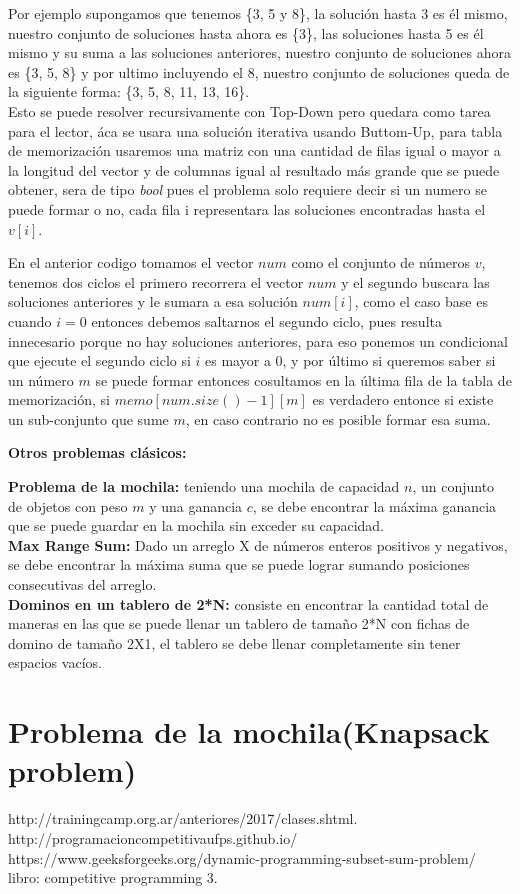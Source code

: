 \documentclass[12pt, a4paper]{article}
\newcommand\cppfile[2][]{

}
\newcommand{\subtitulo}[1]{\begin{center}\textbf{#1}\end{center}}
\begin{document}
	Por ejemplo supongamos que tenemos \{3, 5 y 8\}, la solución hasta 3 es él mismo, nuestro conjunto de soluciones hasta
	ahora es \{3\}, las soluciones hasta 5 es él mismo y su suma a las soluciones anteriores, nuestro conjunto de
	soluciones ahora es \{3, 5, 8\} y por ultimo incluyendo el 8, nuestro conjunto de soluciones queda de la siguiente
	forma: \{3, 5, 8, 11, 13, 16\}.\\
	
	Esto se puede resolver recursivamente con Top-Down pero quedara como tarea para el lector, áca se usara una solución
	iterativa usando Buttom-Up, para tabla de memorización usaremos una matriz con una cantidad de filas igual o mayor
	a la longitud del vector y de columnas igual al resultado más grande que se puede obtener, sera de tipo \textit{bool}
	pues el problema solo requiere decir si un numero se puede formar o no, cada fila i representara las soluciones
	encontradas hasta el $v[i]$.
	\cppfile[8-24]{codigos/SubSetSum.cpp}
	En el anterior codigo tomamos el vector $num$ como el conjunto de números $v$, tenemos dos ciclos el primero
	recorrera el vector $num$ y el segundo buscara las soluciones anteriores y le sumara a esa solución $num[i]$,
	como el caso base es cuando $i=0$ entonces debemos saltarnos el segundo ciclo, pues resulta innecesario
	porque no hay soluciones anteriores, para eso ponemos un condicional que ejecute el segundo ciclo si
	$i$ es mayor a 0, y por último si queremos saber si un número $m$ se puede formar entonces cosultamos en
	la última fila de la tabla de memorización, si $memo[num.size()-1][m]$ es verdadero entonce si existe un 
	sub-conjunto que sume $m$,
	en caso contrario no es posible formar esa suma.

	
	\subtitulo{Otros problemas clásicos:}
	
	\textbf{Problema de la mochila:} teniendo una mochila de capacidad $n$, un conjunto de objetos con peso $m$ 
	y una ganancia $c$, se debe encontrar la máxima ganancia que se puede guardar en la mochila sin
	exceder su capacidad.\\
	
	\textbf{Max Range Sum:} Dado un arreglo X de números enteros positivos y negativos, se debe encontrar la
	máxima suma que se puede lograr sumando posiciones consecutivas del arreglo.\\
	
	\textbf{Dominos en un tablero de 2*N:} consiste en encontrar la cantidad total de maneras en las que se puede
	llenar un tablero de tamaño 2*N con fichas de domino de tamaño 2X1, el tablero se debe llenar completamente sin
	tener espacios vacíos.
	
	\section{Problema de la mochila(Knapsack problem)}
	
	http://trainingcamp.org.ar/anteriores/2017/clases.shtml.\\
	http://programacioncompetitivaufps.github.io/\\
	https://www.geeksforgeeks.org/dynamic-programming-subset-sum-problem/\\
	libro: competitive programming 3.\\
\end{document}
